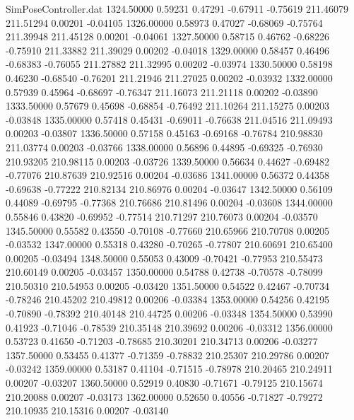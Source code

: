 \begin{filecontents}{SimPoseController.dat}
1324.50000    0.59231    0.47291    -0.67911   -0.75619  211.46079  211.51294    0.00201   -0.04105
1326.00000    0.58973    0.47027    -0.68069   -0.75764  211.39948  211.45128    0.00201   -0.04061
1327.50000    0.58715    0.46762    -0.68226   -0.75910  211.33882  211.39029    0.00202   -0.04018
1329.00000    0.58457    0.46496    -0.68383   -0.76055  211.27882  211.32995    0.00202   -0.03974
1330.50000    0.58198    0.46230    -0.68540   -0.76201  211.21946  211.27025    0.00202   -0.03932
1332.00000    0.57939    0.45964    -0.68697   -0.76347  211.16073  211.21118    0.00202   -0.03890
1333.50000    0.57679    0.45698    -0.68854   -0.76492  211.10264  211.15275    0.00203   -0.03848
1335.00000    0.57418    0.45431    -0.69011   -0.76638  211.04516  211.09493    0.00203   -0.03807
1336.50000    0.57158    0.45163    -0.69168   -0.76784  210.98830  211.03774    0.00203   -0.03766
1338.00000    0.56896    0.44895    -0.69325   -0.76930  210.93205  210.98115    0.00203   -0.03726
1339.50000    0.56634    0.44627    -0.69482   -0.77076  210.87639  210.92516    0.00204   -0.03686
1341.00000    0.56372    0.44358    -0.69638   -0.77222  210.82134  210.86976    0.00204   -0.03647
1342.50000    0.56109    0.44089    -0.69795   -0.77368  210.76686  210.81496    0.00204   -0.03608
1344.00000    0.55846    0.43820    -0.69952   -0.77514  210.71297  210.76073    0.00204   -0.03570
1345.50000    0.55582    0.43550    -0.70108   -0.77660  210.65966  210.70708    0.00205   -0.03532
1347.00000    0.55318    0.43280    -0.70265   -0.77807  210.60691  210.65400    0.00205   -0.03494
1348.50000    0.55053    0.43009    -0.70421   -0.77953  210.55473  210.60149    0.00205   -0.03457
1350.00000    0.54788    0.42738    -0.70578   -0.78099  210.50310  210.54953    0.00205   -0.03420
1351.50000    0.54522    0.42467    -0.70734   -0.78246  210.45202  210.49812    0.00206   -0.03384
1353.00000    0.54256    0.42195    -0.70890   -0.78392  210.40148  210.44725    0.00206   -0.03348
1354.50000    0.53990    0.41923    -0.71046   -0.78539  210.35148  210.39692    0.00206   -0.03312
1356.00000    0.53723    0.41650    -0.71203   -0.78685  210.30201  210.34713    0.00206   -0.03277
1357.50000    0.53455    0.41377    -0.71359   -0.78832  210.25307  210.29786    0.00207   -0.03242
1359.00000    0.53187    0.41104    -0.71515   -0.78978  210.20465  210.24911    0.00207   -0.03207
1360.50000    0.52919    0.40830    -0.71671   -0.79125  210.15674  210.20088    0.00207   -0.03173
1362.00000    0.52650    0.40556    -0.71827   -0.79272  210.10935  210.15316    0.00207   -0.03140

\end{filecontents}
